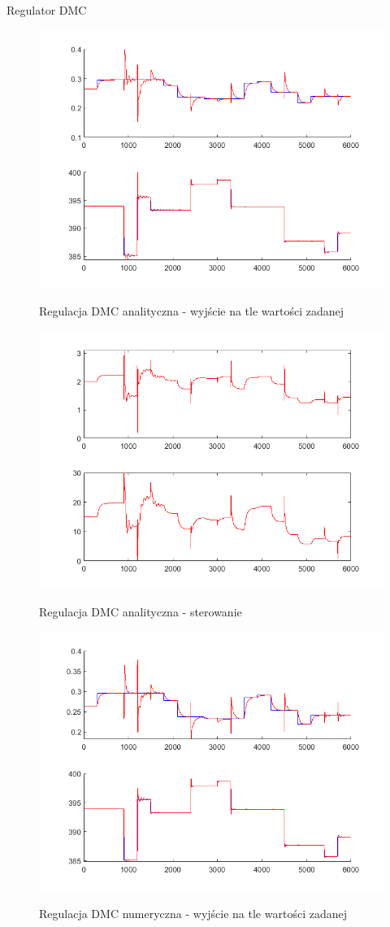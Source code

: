 Regulator DMC
\begin{figure}[h!]
	\centering
	\includegraphics[width=.6\linewidth]{img/yDMC.png}
	\label{ch2:Zadanie}
	\caption{Regulacja DMC analityczna - wyjście na tle wartości zadanej}
\end{figure}
\begin{figure}[h!]
	\centering
	\includegraphics[width=.6\linewidth]{img/uDMC.png}
	\label{ch2:Zadanie}
	\caption{Regulacja DMC analityczna - sterowanie}
\end{figure}
\begin{figure}[h!]
	\centering
	\includegraphics[width=.6\linewidth]{img/yDMCnum.png}
	\label{ch2:Zadanie}
	\caption{Regulacja DMC numeryczna - wyjście na tle wartości zadanej}
\end{figure}
